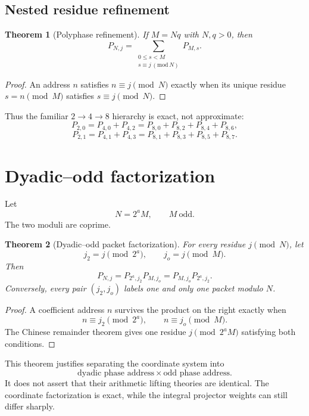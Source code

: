 \documentclass[11pt]{article}
\newtheorem{theorem}{Theorem}[section]
\theoremstyle{definition}
\theoremstyle{remark}
\begin{document}
\subsection{Nested residue refinement}

\begin{theorem}[Polyphase refinement]\label{thm:polyphase-refinement}
If $M=Nq$ with $N,q>0$, then
\[
\boxed{
P_{N,j}
=
\sum_{\substack{0\le s<M\\s\equiv j\,(\mathrm{mod}\,N)}}
P_{M,s}.
}
\]
\end{theorem}

\begin{proof}
An address $n$ satisfies $n\equiv j\pmod N$ exactly when its unique residue $s=n\pmod M$ satisfies $s\equiv j\pmod N$.
\end{proof}

Thus the familiar $2\to4\to8$ hierarchy is exact, not approximate:
\[
P_{2,0}=P_{4,0}+P_{4,2}
=P_{8,0}+P_{8,2}+P_{8,4}+P_{8,6},
\]
\[
P_{2,1}=P_{4,1}+P_{4,3}
=P_{8,1}+P_{8,3}+P_{8,5}+P_{8,7}.
\]

\section{Dyadic--odd factorization}

Let
\[
N=2^aM,
\qquad M\ \text{odd}.
\]
The two moduli are coprime.

\begin{theorem}[Dyadic--odd packet factorization]\label{thm:dyadic-odd}
For every residue $j\pmod N$, let
\[
j_2=j\pmod{2^a},
\qquad
j_o=j\pmod M.
\]
Then
\[
\boxed{
P_{N,j}=P_{2^a,j_2}P_{M,j_o}=P_{M,j_o}P_{2^a,j_2}.
}
\]
Conversely, every pair $(j_2,j_o)$ labels one and only one packet modulo $N$.
\end{theorem}

\begin{proof}
A coefficient address $n$ survives the product on the right exactly when
\[
n\equiv j_2\pmod{2^a},
\qquad
n\equiv j_o\pmod M.
\]
The Chinese remainder theorem gives one residue $j\pmod{2^aM}$ satisfying both conditions.
\end{proof}

This theorem justifies separating the coordinate system into
\[
\boxed{
\text{dyadic phase address}
\times
\text{odd phase address}.
}
\]
It does not assert that their arithmetic lifting theories are identical. The coordinate factorization is exact, while the integral projector weights can still differ sharply.
\end{document}
